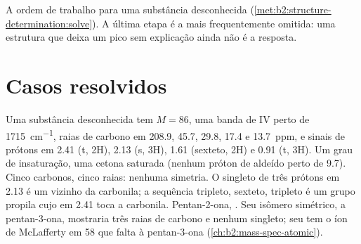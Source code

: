 \begin{omfigure}
\par\vspace{4pt}

{\small A ordem de trabalho para uma substância desconhecida (\cref{met:b2:structure-determination:solve}).
A última etapa é a mais frequentemente omitida: uma estrutura que deixa um pico sem explicação ainda não
é a resposta.}
\end{omfigure}

\section{Casos resolvidos}

\begin{example}\label{ex:b2:structure-determination:ketone}
Uma substância desconhecida tem $M = 86$, uma banda de IV perto de \qty{1715}{cm^{-1}}, raias de carbono em
208.9, 45.7, 29.8, 17.4 e 13.7~ppm, e sinais de prótons em 2.41 (t, 2H), 2.13 (s, 3H), 1.61 (sexteto, 2H)
e 0.91 (t, 3H). Um grau de insaturação, uma cetona saturada (nenhum próton de aldeído perto de 9.7). Cinco
carbonos, cinco raias: nenhuma simetria. O singleto de três prótons em 2.13 é um  vizinho da
carbonila; a sequência tripleto, sexteto, tripleto é um grupo propila cujo  em 2.41 toca a
carbonila. Pentan-2-ona, . Seu isômero simétrico, a pentan-3-ona, mostraria três raias
de carbono e nenhum singleto; seu  tem o íon de McLafferty em 58 que falta à
pentan-3-ona (\cref{ch:b2:mass-spec-atomic}).
\end{example}

